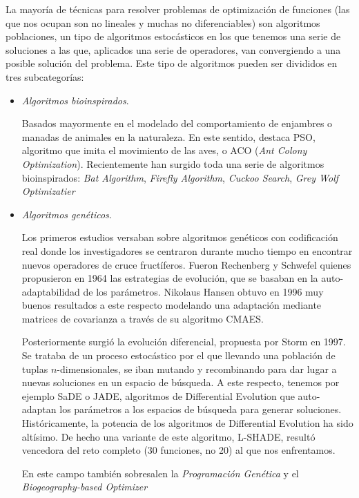 \documentclass[a4paper,11pt]{article}
\begin{document}
La mayoría de técnicas para resolver problemas de optimización de funciones (las que nos ocupan son no lineales y muchas no diferenciables)
son algoritmos poblaciones, un tipo de algoritmos estocásticos en los que tenemos una serie de soluciones a las que, aplicados una serie de
operadores, van convergiendo a una posible solución del problema. Este tipo de algoritmos pueden ser divididos en tres subcategorías:

\begin{itemize}
 \item \textit{Algoritmos bioinspirados}.
 
  Basados mayormente en el modelado del comportamiento de enjambres o manadas de animales
  en la naturaleza. En este sentido, destaca PSO, algoritmo que imita el movimiento de las aves, o ACO (\textit{Ant Colony
  Optimization}). Recientemente han surgido toda una serie de algoritmos bioinspirados: \textit{Bat Algorithm}, \textit{Firefly
  Algorithm}, \textit{Cuckoo Search}, \textit{Grey Wolf Optimizatier}
  
 \item \textit{Algoritmos genéticos}.
 
  Los primeros estudios versaban sobre algoritmos genéticos con codificación real donde los investigadores se centraron durante mucho tiempo en
  encontrar nuevos operadores de cruce fructíferos. Fueron Rechenberg y Schwefel quienes propusieron en 1964 las estrategias
  de evolución, que se basaban en la auto-adaptabilidad de los parámetros. Nikolaus Hansen obtuvo en 1996 muy buenos resultados
  a este respecto modelando una adaptación mediante matrices de covarianza a través de su algoritmo CMAES.
  
  Posteriormente surgió la evolución diferencial, propuesta por Storm en 1997. Se trataba de un proceso estocástico por el que
  llevando una población de tuplas $n$-dimensionales, se iban mutando y recombinando para dar lugar a nuevas soluciones en un espacio
  de búsqueda. A este respecto, tenemos por ejemplo SaDE o JADE, algoritmos de Differential Evolution que auto-adaptan los 
  parámetros a los espacios de búsqueda para generar soluciones. Históricamente, la potencia de los algoritmos de Differential
  Evolution ha sido altísimo. De hecho una variante de este algoritmo, L-SHADE, resultó vencedora del reto completo (30 funciones,
  no 20) al que nos enfrentamos.
  
  En este campo también sobresalen la \textit{Programación Genética} y el \textit{Biogeography-based Optimizer}


\end{itemize}
\end{document}
